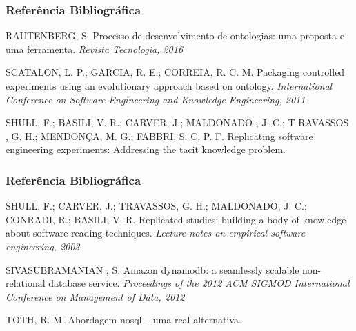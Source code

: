 \documentclass[aspectratio=169]{beamer}
\begin{document}
\begin{frame}
\frametitle{Referência Bibliográfica}
\footnotesize{
\begin{thebibliography}{99} %


 RAUTENBERG, S.
\newblock Processo de desenvolvimento de ontologias: uma proposta e uma ferramenta.
\newblock \emph{Revista Tecnologia, 2016}

 SCATALON, L. P.; GARCIA, R. E.; CORREIA, R. C. M.
\newblock Packaging controlled experiments using an evolutionary approach based on ontology.
\newblock \emph{International Conference on Software Engineering and Knowledge Engineering, 2011}


 SHULL, F.; BASILI, V. R.; CARVER, J.; MALDONADO , J. C.; T RAVASSOS , G. H.; MENDONÇA, M. G.; FABBRI, S. C. P. F.
\newblock Replicating software engineering experiments: Addressing the tacit knowledge problem.

\end{thebibliography}
}
\end{frame}

\begin{frame}
\frametitle{Referência Bibliográfica}
\footnotesize{
\begin{thebibliography}{99} %

 SHULL, F.; CARVER, J.; TRAVASSOS, G. H.; MALDONADO, J. C.; CONRADI, R.; BASILI, V. R. 
\newblock Replicated studies: building a body of knowledge about software reading techniques.
\newblock \emph{Lecture notes on empirical software engineering, 2003}

 SIVASUBRAMANIAN , S.
\newblock Amazon dynamodb: a seamlessly scalable non-relational database service.
\newblock \emph{Proceedings of the 2012 ACM SIGMOD International Conference on
Management of Data, 2012}

 TOTH, R. M.
\newblock Abordagem nosql – uma real alternativa.

\end{thebibliography}
}
\end{frame}
\end{document}
